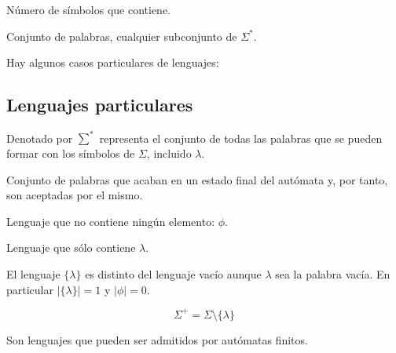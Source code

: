 \documentclass{apuntes}
\begin{document}
\begin{defn}
Número de símbolos que contiene.
\end{defn}

\begin{defn}[Lenguaje]
Conjunto de palabras, cualquier subconjunto de $\Sigma^*$.
\end{defn}

Hay algunos casos particulares de lenguajes:
\subsection{Lenguajes particulares}
\begin{defn}
Denotado por $\sum^*$ representa el conjunto de todas las palabras que se pueden formar con los símbolos de $\Sigma$, incluido $\lambda$.
\end{defn}

\begin{defn}
Conjunto de palabras que acaban en un estado final del autómata y, por tanto, son aceptadas por el mismo.
\end{defn}

\begin{defn}
Lenguaje que no contiene ningún elemento: $\phi$.
\end{defn}

\begin{defn}
Lenguaje que sólo contiene $\lambda$.
\end{defn}
El lenguaje $\lbrace \lambda \rbrace$ es distinto del lenguaje vacío aunque $\lambda$ sea la palabra vacía. En particular $|\{\lambda\}|=1$ y $|\phi|=0$.

\begin{defn}
\[ \Sigma^+ = \Sigma \setminus \lbrace \lambda \rbrace \]
\end{defn}

\begin{defn}
Son lenguajes que pueden ser admitidos por autómatas finitos.
\end{defn}
\end{document}
